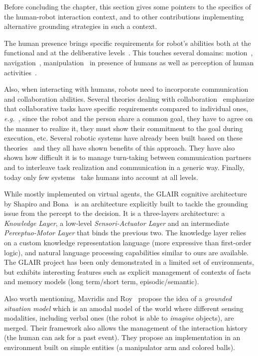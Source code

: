 \documentclass{svmult}
\newcommand{\eg}{{\textit{e.g.~}}}
\begin{document}
Before concluding the chapter, this section gives some pointers to the specifics of the human-robot interaction context, 
and to other contributions implementing alternative grounding strategies in such a context.


The human presence brings specific requirements for robot's abilities both
at the functional and at the deliberative levels~\cite{Klein2004}. This touches several domains:
 motion~\cite{Kulic2007,Berg2004,Madhav2006},
navigation~\cite{Althaus2004,Sisbot2007}, manipulation~\cite{Kemp2007}
in presence of humans as well as perception of human
activities~\cite{Breazeal2001,Burger2008}.

Also, when interacting with humans, robots need to incorporate communication and
collaboration abilities. Several theories dealing with
collaboration~\cite{Cohen1991,Grosz1996,Clark1996} emphasize that
collaborative tasks have specific requirements compared to individual
ones, \eg, since the robot and the person share a common goal, they
have to agree on the manner to realize it, they must show their
commitment to the goal during execution, etc. Several robotic systems
have already been built based on these theories~\cite{Rich1997,Sidner2005,Tambe1997,Breazeal2003} and they
all have shown benefits of this approach. They have also shown how
difficult it is to manage turn-taking between communication partners
and to interleave task realization and communication in a generic
way. Finally, today only few systems~\cite{Fong2006,Breazeal2003,Sisbot2008} take humans into
account at all levels.


While mostly implemented on virtual agents, the GLAIR cognitive architecture by
Shapiro and Bona~\cite{Shapiro2009} is an architecture explicitly built to
tackle the grounding issue from the percept to the decision. It is a
three-layers architecture: a \emph{Knowledge Layer}, a low-level
\emph{Sensori-Actuator Layer} and an intermediate \emph{Perceptuo-Motor Layer}
that binds the previous two.  The knowledge layer relies on a custom knowledge
representation language (more expressive than first-order logic), and natural
language processing capabilities similar to ours are available. The GLAIR
project has been only demonstrated in a limited set of environments, but
exhibits interesting features such as explicit management of contexts of facts
and memory models (long term/short term, episodic/semantic).

Also worth mentioning, Mavridis and Roy~\cite{Mavridis2005} propose the idea of
a \emph{grounded situation model} which is an amodal model of the world where
different sensing modalities, including verbal ones (the robot is able to
\emph{imagine} objects), are merged. Their framework also allows the management of
the interaction history (the human can ask for a past event). They propose an
implementation in an environment built on simple entities (a manipulator arm
and colored balls).
\end{document}

